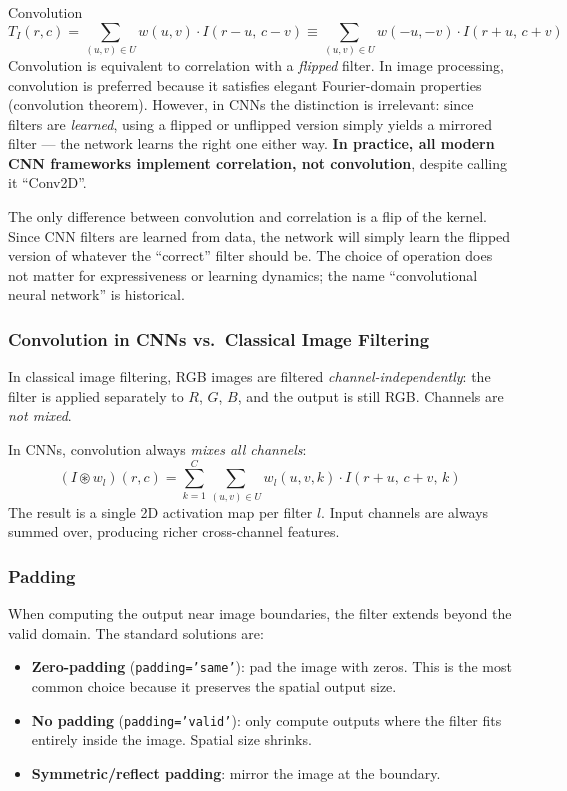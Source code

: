 \documentclass[11pt,a4paper]{article}
\begin{document}
\begin{defbox}{Convolution}
\[
T_I(r,c) = \sum_{(u,v)\in U} w(u,v)\cdot I(r-u,\, c-v)
\equiv \sum_{(u,v)\in U} w(-u,-v)\cdot I(r+u,\, c+v)
\]
Convolution is equivalent to correlation with a \emph{flipped} filter. In image processing, convolution is preferred because it satisfies elegant Fourier-domain properties (convolution theorem). However, in CNNs the distinction is irrelevant: since filters are \emph{learned}, using a flipped or unflipped version simply yields a mirrored filter — the network learns the right one either way. \textbf{In practice, all modern CNN frameworks implement correlation, not convolution}, despite calling it ``Conv2D''.
\end{defbox}

\begin{insightbox}
The only difference between convolution and correlation is a flip of the kernel. Since CNN filters are learned from data, the network will simply learn the flipped version of whatever the ``correct'' filter should be. The choice of operation does not matter for expressiveness or learning dynamics; the name ``convolutional neural network'' is historical.
\end{insightbox}

\subsubsection{Convolution in CNNs vs.\ Classical Image Filtering}

In classical image filtering, RGB images are filtered \emph{channel-independently}: the filter is applied separately to $R$, $G$, $B$, and the output is still RGB. Channels are \emph{not mixed}.

In CNNs, convolution always \emph{mixes all channels}:
\[
(I \circledast w_l)(r,c) = \sum_{k=1}^{C}\sum_{(u,v)\in U} w_l(u,v,k)\cdot I(r+u,\, c+v,\, k)
\]
The result is a single 2D activation map per filter $l$. Input channels are always summed over, producing richer cross-channel features.

\subsubsection{Padding}

When computing the output near image boundaries, the filter extends beyond the valid domain. The standard solutions are:
\begin{itemize}
  \item \textbf{Zero-padding} (\texttt{padding='same'}): pad the image with zeros. This is the most common choice because it preserves the spatial output size.
  \item \textbf{No padding} (\texttt{padding='valid'}): only compute outputs where the filter fits entirely inside the image. Spatial size shrinks.
  \item \textbf{Symmetric/reflect padding}: mirror the image at the boundary.
\end{itemize}
\end{document}
